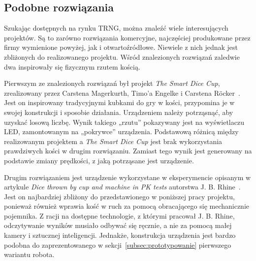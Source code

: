 \subsection{Podobne rozwiązania}\label{sec:podobne-rozwiazania}

Szukając dostępnych na rynku TRNG, można znaleźć wiele interesujących projektów. Są to zarówno rozwiązania komercyjne, 
najczęściej produkowane przez firmy wymienione powyżej, jak i otwartoźródłowe. Niewiele z nich jednak jest zbliżonych 
do realizowanego projektu. Wśród znalezionych rozwiązań zaledwie dwa inspirowały się fizycznym rzutem kością.

Pierwszym ze znalezionych rozwiązań był projekt \textit{The Smart Dice Cup}, zrealizowany przez Carstena Magerkurth,
Timo'a Engelke i Carstena Röcker~\cite{SmartDice}.
Jest on inspirowany tradycyjnymi kubkami do gry w kości, przypomina je w swojej konstrukcji i sposobie działania.
Urządzeniem należy potrząsnąć, aby uzyskać losową liczbę.
Wynik takiego „rzutu” pokazywany jest na wyświetlaczu LED, zamontowanym na „pokrywce” urządzenia.
Podstawową różnicą między realizowanym projektem a \textit{The Smart Dice Cup} jest brak wykorzystania prawdziwych
kości w drugim rozwiązaniu.
Zamiast tego wynik jest generowany na podstawie zmiany prędkości, z jaką potrząsane jest urządzenie.

Drugim rozwiązaniem jest urządzenie wykorzystane w eksperymencie opisanym w artykule \textit{Dice thrown by cup and machine in PK tests} autorstwa J. B. Rhine~\cite{betoniarka43}.
Jest on najbardziej zbliżony do przedstawionego w poniższej pracy projektu, ponieważ również wprawia kość w
ruch za pomocą obracającego się mechanicznie pojemnika.
Z racji na dostępne technologie, z którymi pracował J. B. Rhine, odczytywanie wyników musiało odbywać się ręcznie, a nie za pomocą małej kamery i sztucznej inteligencji.
Jednakże, konstrukcja urządzenia jest bardzo podobna do zaprezentowanego w sekcji~\ref{subsec:prototypowanie} pierwszego wariantu robota.
